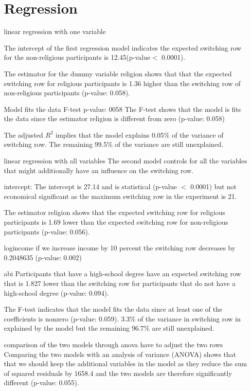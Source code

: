 \documentclass[12pt,a4paper]{article}
\begin{document}
\section{Regression}
linear regression with one variable

The intercept of the first regression model indicates the expected switching row for the non-religious participants is 12.45(p-value$<$ 0.0001). 
 
The estimator for the dummy variable religion shows that that the expected switching row for religious participants is 1.36 higher than the switching row of non-religious participants (p-value: 0.058).

Model fits the data F-test p-value: 0058
The F-test shows that the model is fits the data since the estimator religion is different from zero (p-value: 0.058) 

The adjusted $R^2$ implies that the model explains 0.05\% of the variance of switching row. The remaining 99.5\% of the variance are still unexplained. 
 



linear regression with all variables
The second model controls for all the variables that might additionally have an influence on the switching row.


intercept: 
The intercept is 27.14 and is statistical (p-value $<$ 0.0001) but not economical significant as the maximum switching row in the experiment is 21. 

The estimator religion shows that the expected switching row for religious participants is  1.69 lower than the expected switching row for non-religious participants (p-value: 0.056).

logincome 
if we increase income by 10 percent the switching row decreases by 0.2048635 (p-value: 0.002)


abi
Participants that have a high-school degree have an expected switching row that is 1.827 lower than the switching row for participants that do not have a high-school degree (p-value: 0.094).



The F-test indicates that the model fits the data since at least one of the coefficients is nonzero (p-value: 0.059). 
3.3\% of the variance in switching row in explained by the model but the remaining 96.7\% are still unexplained. 


comparison of the two models through anova 
have to adjust the two rows 
Comparing the two models with an analysis of variance (ANOVA) shows that that we should keep the additional variables in the model as they reduce the sum of squared residuals by 1658.4 and the two models are therefore significantly different (p-value: 0.055). 
\end{document}
